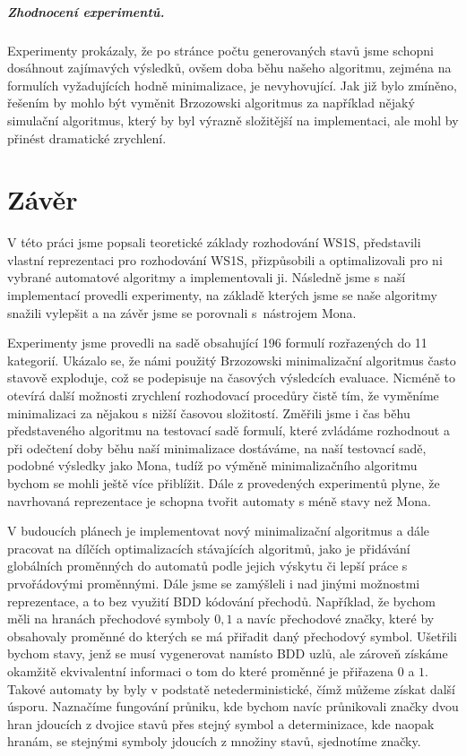 \paragraph{Zhodnocení experimentů.} Experimenty prokázaly, že po stránce počtu generovaných stavů jsme schopni dosáhnout zajímavých výsledků, ovšem doba běhu našeho algoritmu, zejména na formulích vyžadujících hodně minimalizace, je nevyhovující. Jak již bylo zmíněno, řešením by mohlo být vyměnit Brzozowski algoritmus za například nějaký simulační algoritmus, který by byl výrazně složitější na implementaci, ale mohl by přinést dramatické zrychlení.

\chapter{Závěr}
\label{5_zaver}

V této práci jsme popsali teoretické základy rozhodování WS1S, představili vlastní reprezentaci pro rozhodování WS1S, přizpůsobili a optimalizovali pro ni vybrané automatové algoritmy a implementovali ji. Následně jsme s naší implementací provedli experimenty, na základě kterých jsme se naše algoritmy snažili vylepšit a na závěr jsme se porovnali s~nástrojem Mona.

Experimenty jsme provedli na sadě obsahující 196 formulí rozřazených do 11 kategorií. Ukázalo se, že námi použitý Brzozowski minimalizační algoritmus často stavově exploduje, což se podepisuje na časových výsledcích evaluace. Nicméně to otevírá další možnosti zrychlení rozhodovací procedůry čistě tím, že vyměníme minimalizaci za nějakou s nižší časovou složitostí. Změřili jsme i čas běhu představeného algoritmu na testovací sadě formulí, které zvládáme rozhodnout a při odečtení doby běhu naší minimalizace dostáváme, na naší testovací sadě, podobné výsledky jako Mona, tudíž po výměně minimalizačního algoritmu bychom se mohli ještě více přiblížit. Dále z provedených experimentů plyne, že navrhovaná reprezentace je schopna tvořit automaty s méně stavy než Mona. 

V budoucích plánech je implementovat nový minimalizační algoritmus a dále pracovat na dílčích optimalizacích stávajících algoritmů, jako je přidávání globálních proměnných do automatů podle jejich výskytu či lepší práce s prvořádovými proměnnými. Dále jsme se zamýšleli i nad jinými možnostmi reprezentace, a to bez využití BDD kódování přechodů. Například, že bychom měli na hranách přechodové symboly $0,1$ a navíc přechodové značky, které by obsahovaly proměnné do kterých se má přiřadit daný přechodový symbol. Ušetřili bychom stavy, jenž se musí vygenerovat namísto BDD uzlů, ale zároveň získáme okamžitě ekvivalentní informaci o tom do které proměnné je přiřazena $0$ a $1$. Takové automaty by byly v podstatě netederministické, čímž můžeme získat další úsporu. Naznačíme fungování průniku, kde bychom navíc průnikovali značky dvou hran jdoucích z dvojice stavů přes stejný symbol a determinizace, kde naopak hranám, se stejnými symboly jdoucích z množiny stavů, sjednotíme značky.

